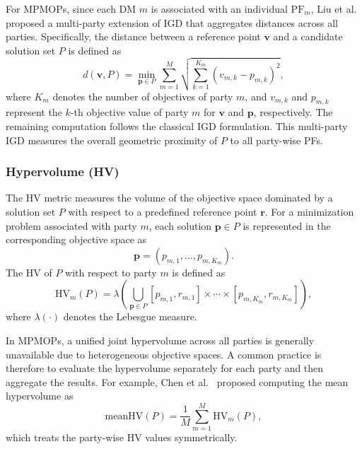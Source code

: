 \documentclass[journal]{IEEEtran}
\begin{document}
For MPMOPs, since each DM $m$ is associated with an individual $\mathrm{PF}_m$, Liu et al.~\cite{liu2020evolutionary} proposed a multi-party extension of IGD that aggregates distances across all parties. Specifically, the distance between a reference point $\mathbf{v}$ and a candidate solution set $P$ is defined as
\begin{equation}
		d(\mathbf{v}, P) = \min_{\mathbf{p} \in P} \sum_{m=1}^{M}
		\sqrt{\sum_{k=1}^{K_m} (v_{m,k} - p_{m,k})^2},
\end{equation}
where $K_m$ denotes the number of objectives of party $m$, and $v_{m,k}$ and $p_{m,k}$ represent the $k$-th objective value of party $m$ for $\mathbf{v}$ and $\mathbf{p}$, respectively. The remaining computation follows the classical IGD formulation. This multi-party IGD measures the overall geometric proximity of $P$ to all party-wise PFs.

\subsubsection{Hypervolume (HV)}

The HV metric measures the volume of the objective space dominated by a solution set $P$ with respect to a predefined reference point $\mathbf{r}$. For a minimization problem associated with party $m$, each solution $\mathbf{p} \in P$ is represented in the corresponding objective space as
\[
\mathbf{p} = (p_{m,1},\dots,p_{m,K_m}).
\]
The HV of $P$ with respect to party $m$ is defined as
\begin{equation}
	\label{def:HV}
	\mathrm{HV}_m(P)
	= \lambda\!\left(
	\bigcup_{\mathbf{p} \in P}
	[p_{m,1}, r_{m,1}] \times \cdots \times [p_{m,K_m}, r_{m,K_m}]
	\right),
\end{equation}
where $\lambda(\cdot)$ denotes the Lebesgue measure.

In MPMOPs, a unified joint hypervolume across all parties is generally unavailable due to heterogeneous objective spaces. A common practice is therefore to evaluate the hypervolume separately for each party and then aggregate the results. For example, Chen et al.~\cite{chen2024evolutionary} proposed computing the mean hypervolume as
\begin{equation}
	\mathrm{meanHV}(P) = \frac{1}{M}\sum_{m=1}^M \mathrm{HV}_m(P),
\end{equation}
which treats the party-wise HV values symmetrically.
\end{document}
